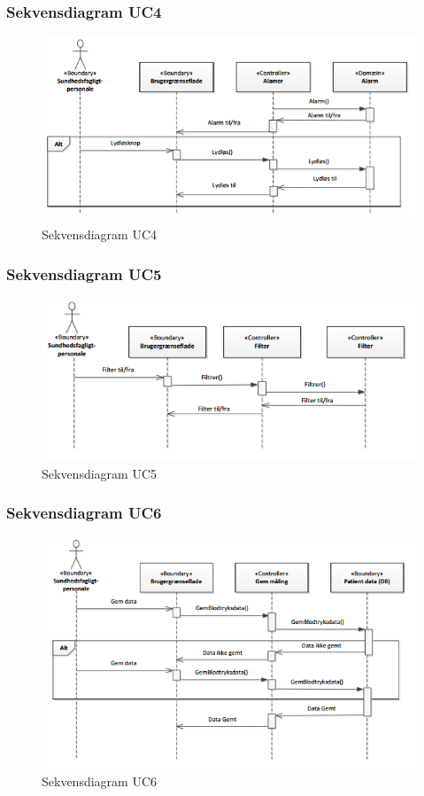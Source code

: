 \subsubsection{Sekvensdiagram UC4}
\begin{figure}[H]
\centering
\includegraphics[scale=0.70]{sd4.PNG}
\caption{Sekvensdiagram UC4}
\end{figure}

\subsubsection{Sekvensdiagram UC5}
\begin{figure}[H]
\centering
\includegraphics[scale=0.70]{sd5.PNG}
\caption{Sekvensdiagram UC5}
\end{figure}

\subsubsection{Sekvensdiagram UC6}
\begin{figure}[H]
\centering
\includegraphics[scale=0.70]{sd6.PNG}
\caption{Sekvensdiagram UC6}
\end{figure}


